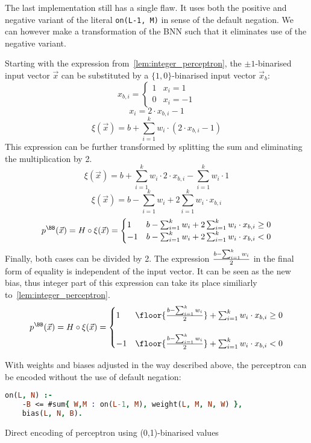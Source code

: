 
The last implementation still has a single flaw. It uses both the positive
and negative variant of the literal \texttt{on(L-1, M)} in sense of the default
negation. We can however make a transformation of the BNN such that it eliminates
use of the negative variant.%
\label{sec:01-mapping}

Starting with the expression from~\ref{lem:integer_perceptron}, the $\pm 1$-binarised
input vector $\vec x$ can be substituted by a $\{1,0\}$-binarised input vector
$\vec x_b$:
\[x_{b,i} = \begin{cases}
    1 & x_i = 1\\
    0 & x_i = -1
\end{cases}\]
\[x_i = 2\cdot x_{b,i} - 1\]
\[\xi(\vec x) = b + \sum_{i=1}^k w_i\cdot (2\cdot x_{b,i} - 1)\]
This expression can be further transformed by splitting the sum and eliminating
the multiplication by 2.
\[\xi(\vec x) = b + \sum_{i=1}^k w_i\cdot 2 \cdot x_{b,i} - \sum_{i=1}^k w_i\cdot 1\]
\[\xi(\vec x) = b - \sum_{i=1}^k w_i + 2\sum_{i=1}^k w_i \cdot x_{b,i}\]
\[p^\BB(\vec x) = H \circ \xi (\vec x) = \begin{cases}
    1 & b - \sum_{i=1}^k w_i + 2\sum_{i=1}^k w_i \cdot x_{b,i} \geq 0\\
    -1 & b - \sum_{i=1}^k w_i + 2\sum_{i=1}^k w_i \cdot x_{b,i} < 0
\end{cases}\]
Finally, both cases can be divided by 2. The expression $b-\sum_{i=1}^k w_i\over 2$
in the final form of equality is independent of the input vector.
It can be seen as the new bias, thus integer part of this expression can take its
place similiarly to~\cref{lem:integer_perceptron}.
\[p^\BB(\vec x) = H \circ \xi (\vec x) = \begin{cases}
    1 & \floor{{b - \sum_{i=1}^k w_i \over 2}} + \sum_{i=1}^k w_i \cdot x_{b,i} \geq 0\\
    {} & {}\\
    -1 & \floor{{b - \sum_{i=1}^k w_i \over 2}} + \sum_{i=1}^k w_i \cdot x_{b,i} < 0
\end{cases}\]

With weights and biases adjusted in the way described above, the perceptron can be
encoded without the use of default negation:

\begin{code}
\begin{lstlisting}[language=Prolog, numbers=none]
on(L, N) :-
    -B <= #sum{ W,M : on(L-1, M), weight(L, M, N, W) },
    bias(L, N, B).
\end{lstlisting}
    \caption{Direct encoding of perceptron using (0,1)-binarised values}\label{enc:perc_direct_01}
\end{code}

